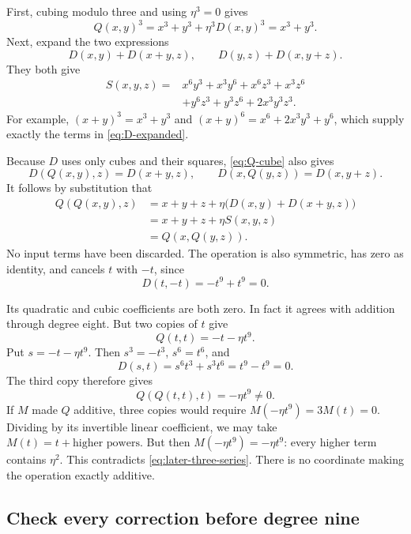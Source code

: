 \documentclass[11pt,letterpaper]{article}
\numberwithin{equation}{section}
\theoremstyle{definition}\newtheorem{example}[theorem]{Example}
\begin{document}
First, cubing modulo three and using \(\eta^3=0\) gives
\begin{equation}\label{eq:Q-cube}
 Q(x,y)^3=x^3+y^3+\eta^3D(x,y)^3=x^3+y^3.
\end{equation}
Next, expand the two expressions
\[
 D(x,y)+D(x+y,z),\qquad D(y,z)+D(x,y+z).
\]
They both give
\begin{equation}\label{eq:D-expanded}
 \begin{split}
 S(x,y,z)={}&x^6y^3+x^3y^6+x^6z^3+x^3z^6\\
 &+y^6z^3+y^3z^6+2x^3y^3z^3.
 \end{split}
\end{equation}
For example, \((x+y)^3=x^3+y^3\) and \((x+y)^6=x^6+2x^3y^3+y^6\), which supply exactly the terms in \eqref{eq:D-expanded}.

Because \(D\) uses only cubes and their squares, \eqref{eq:Q-cube} also gives
\[
 D(Q(x,y),z)=D(x+y,z),\qquad
 D(x,Q(y,z))=D(x,y+z).
\]
It follows by substitution that
\begin{align*}
 Q(Q(x,y),z)
 &=x+y+z+\eta\bigl(D(x,y)+D(x+y,z)\bigr)\\
 &=x+y+z+\eta S(x,y,z)\\
 &=Q(x,Q(y,z)).
\end{align*}
No input terms have been discarded. The operation is also symmetric, has zero as identity, and cancels \(t\) with \(-t\), since
\[
 D(t,-t)=-t^9+t^9=0.
\]

Its quadratic and cubic coefficients are both zero. In fact it agrees with addition through degree eight. But two copies of \(t\) give
\[
 Q(t,t)=-t-\eta t^9.
\]
Put \(s=-t-\eta t^9\). Then \(s^3=-t^3\), \(s^6=t^6\), and
\[
 D(s,t)=s^6t^3+s^3t^6=t^9-t^9=0.
\]
The third copy therefore gives
\begin{equation}\label{eq:later-three-series}
 \boxed{\;Q(Q(t,t),t)=-\eta t^9\ne0.\;}
\end{equation}
If \(M\) made \(Q\) additive, three copies would require \(M(-\eta t^9)=3M(t)=0\). Dividing by its invertible linear coefficient, we may take \(M(t)=t+\text{higher powers}\). But then \(M(-\eta t^9)=-\eta t^9\): every higher term contains \(\eta^2\). This contradicts \eqref{eq:later-three-series}. There is no coordinate making the operation exactly additive.

\subsection{Check every correction before degree nine}
\end{document}
